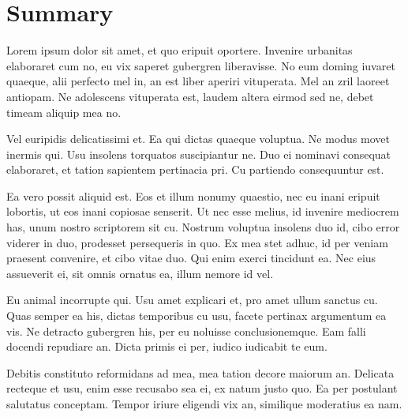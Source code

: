 \chapter*{Summary}

Lorem ipsum dolor sit amet, et quo eripuit oportere. Invenire urbanitas elaboraret cum no, eu vix saperet gubergren liberavisse. No eum doming iuvaret quaeque, alii perfecto mel in, an est liber aperiri vituperata. Mel an zril laoreet antiopam. Ne adolescens vituperata est, laudem altera eirmod sed ne, debet timeam aliquip mea no.

Vel euripidis delicatissimi et. Ea qui dictas quaeque voluptua. Ne modus movet inermis qui. Usu insolens torquatos suscipiantur ne. Duo ei nominavi consequat elaboraret, et tation sapientem pertinacia pri. Cu partiendo consequuntur est.

Ea vero possit aliquid est. Eos et illum nonumy quaestio, nec eu inani eripuit lobortis, ut eos inani copiosae senserit. Ut nec esse melius, id invenire mediocrem has, unum nostro scriptorem sit cu. Nostrum voluptua insolens duo id, cibo error viderer in duo, prodesset persequeris in quo. Ex mea stet adhuc, id per veniam praesent convenire, et cibo vitae duo. Qui enim exerci tincidunt ea. Nec eius assueverit ei, sit omnis ornatus ea, illum nemore id vel.

Eu animal incorrupte qui. Usu amet explicari et, pro amet ullum sanctus cu. Quas semper ea his, dictas temporibus cu usu, facete pertinax argumentum ea vis. Ne detracto gubergren his, per eu noluisse conclusionemque. Eam falli docendi repudiare an. Dicta primis ei per, iudico iudicabit te eum.

Debitis constituto reformidans ad mea, mea tation decore maiorum an. Delicata recteque et usu, enim esse recusabo sea ei, ex natum justo quo. Ea per postulant salutatus conceptam. Tempor iriure eligendi vix an, similique moderatius ea nam.
